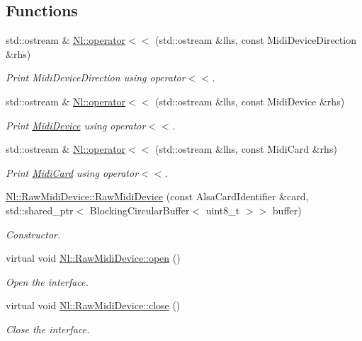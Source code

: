 \subsection*{Functions}
\begin{DoxyCompactItemize}
\item 
std\-::ostream \& \hyperlink{group__Midi_gaefa21e4261d1168eec79e36db5859c67}{Nl\-::operator$<$$<$} (std\-::ostream \&lhs, const Midi\-Device\-Direction \&rhs)
\begin{DoxyCompactList}\small\item\em Print Midi\-Device\-Direction using operator$<$$<$. \end{DoxyCompactList}\item 
std\-::ostream \& \hyperlink{group__Midi_ga39552abb8475b7a722d4710b056d9e2e}{Nl\-::operator$<$$<$} (std\-::ostream \&lhs, const Midi\-Device \&rhs)
\begin{DoxyCompactList}\small\item\em Print \hyperlink{structNl_1_1MidiDevice}{Midi\-Device} using operator$<$$<$. \end{DoxyCompactList}\item 
std\-::ostream \& \hyperlink{group__Midi_ga8876ffd695a43dee285ebda5dc6c2a25}{Nl\-::operator$<$$<$} (std\-::ostream \&lhs, const Midi\-Card \&rhs)
\begin{DoxyCompactList}\small\item\em Print \hyperlink{structNl_1_1MidiCard}{Midi\-Card} using operator$<$$<$. \end{DoxyCompactList}\item 
\hyperlink{group__Midi_ga8be460b3e5b9b06cb21d1b47f7f488ab}{Nl\-::\-Raw\-Midi\-Device\-::\-Raw\-Midi\-Device} (const Alsa\-Card\-Identifier \&card, std\-::shared\-\_\-ptr$<$ Blocking\-Circular\-Buffer$<$ uint8\-\_\-t $>$$>$ buffer)
\begin{DoxyCompactList}\small\item\em Constructor. \end{DoxyCompactList}\item 
virtual void \hyperlink{group__Midi_gace91f1137effd037eca8b3b959508f91}{Nl\-::\-Raw\-Midi\-Device\-::open} ()
\begin{DoxyCompactList}\small\item\em Open the interface. \end{DoxyCompactList}\item 
virtual void \hyperlink{group__Midi_gaa66489de15df30f282637b8a1bcd263d}{Nl\-::\-Raw\-Midi\-Device\-::close} ()
\begin{DoxyCompactList}\small\item\em Close the interface. \end{DoxyCompactList}\item 
$$
\end{DoxyCompactItemize}

